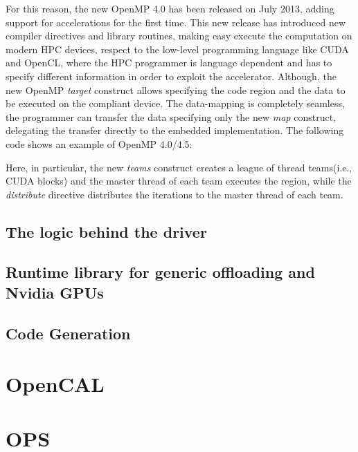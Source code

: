 For this reason, the new OpenMP 4.0 has been released on July 2013, adding support for accelerations for the first time. 
This new release has introduced new compiler directives and library routines, making easy execute the computation on modern HPC devices, respect to the low-level programming language like CUDA and OpenCL, where the HPC programmer is language dependent and has to specify different information in order to exploit the accelerator. Although, the new OpenMP \emph{target} construct allows specifying the code region and the data to be executed on the compliant device. The data-mapping is completely seamless, the programmer can transfer the data specifying only the new \emph{map} construct, delegating the transfer directly to the embedded implementation. The following code shows an example of OpenMP 4.0/4.5:



Here, in particular, the new \emph{teams} construct creates a league of thread teams(i.e., CUDA blocks) and the master thread of each team executes the region, while the\emph{ distribute}
directive distributes the iterations to the master thread of each team.


\subsection{The logic behind the driver}

\subsection{Runtime library for generic offloading and Nvidia GPUs}

\subsection{Code Generation}


\section{OpenCAL}

\section{OPS}